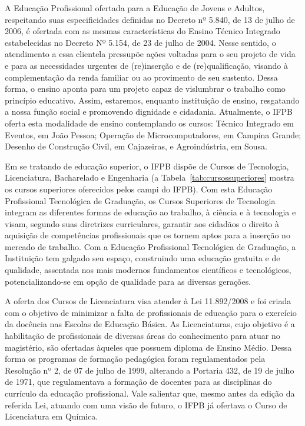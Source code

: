 	A Educação Profissional ofertada para a Educação de Jovens e Adultos, respeitando suas especificidades definidas no Decreto nº 5.840, de 13 de julho de 2006, é ofertada com as mesmas características do Ensino Técnico Integrado estabelecidas no Decreto Nº 5.154, de 23 de julho de 2004. Nesse sentido, o atendimento a essa clientela pressupõe ações voltadas para o seu projeto de vida e para as necessidades urgentes de (re)inserção e de (re)qualificação, visando à complementação da renda familiar ou ao provimento de seu sustento. Dessa forma, o ensino aponta para um projeto capaz de vislumbrar o trabalho como princípio educativo. Assim, estaremos, enquanto instituição de ensino, resgatando a nossa função social e promovendo dignidade e cidadania. Atualmente, o IFPB oferta esta modalidade de ensino contemplando os cursos: Técnico Integrado em Eventos, em João Pessoa; Operação de Microcomputadores, em Campina Grande; Desenho de Construção Civil, em Cajazeiras, e Agroindústria, em Sousa. 
	
	\newpage
	
	Em se tratando de educação superior, o IFPB dispõe de Cursos de Tecnologia, Licenciatura, Bacharelado e Engenharia (a Tabela~\ref{tab:cursossuperiores} mostra os cursos superiores oferecidos pelos campi do IFPB). Com esta Educação Profissional Tecnológica de Graduação, os Cursos Superiores de Tecnologia integram as diferentes formas de educação ao trabalho, à ciência e à tecnologia e visam, segundo suas diretrizes curriculares, garantir aos cidadãos o direito à aquisição de competências profissionais que os tornem aptos para a inserção no mercado de trabalho. Com a Educação Profissional Tecnológica de Graduação, a Instituição tem galgado seu espaço, construindo uma educação gratuita e de qualidade, assentada nos mais modernos fundamentos científicos e tecnológicos, potencializando-se em opção de qualidade para as diversas gerações.

	A oferta dos Cursos de Licenciatura visa atender à Lei 11.892/2008 e foi criada com o objetivo de minimizar a falta de profissionais de educação para o exercício da docência nas Escolas de Educação Básica. As Licenciaturas, cujo objetivo é a habilitação de profissionais de diversas áreas do conhecimento para atuar no magistério, são ofertadas àqueles que possuem diploma de Ensino Médio. Dessa forma os programas de formação pedagógica foram regulamentados pela Resolução nº 2, de 07 de julho de 1999, alterando a Portaria 432, de 19 de julho de 1971, que regulamentava a formação de docentes para as disciplinas do currículo da educação profissional. Vale salientar que, mesmo antes da edição da referida Lei, atuando com uma visão de futuro, o IFPB já ofertava o Curso de Licenciatura em Química.
	
